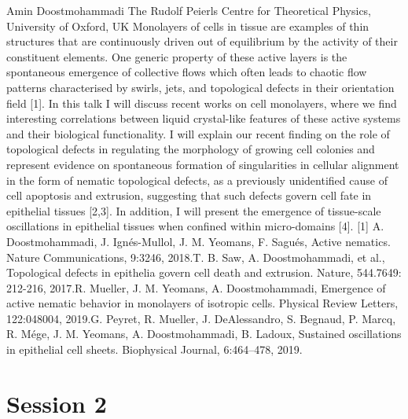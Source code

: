 \documentclass{article}
\begin{document}
{Amin Doostmohammadi}
{The Rudolf Peierls Centre for Theoretical Physics, University of Oxford, UK}
{Monolayers of cells in tissue are examples of thin structures that are continuously driven out of
equilibrium by the activity of their constituent elements. One generic property of these active
layers is the spontaneous emergence of collective flows which often leads to chaotic flow patterns
characterised by swirls, jets, and topological defects in their orientation field [1]. In this talk I
will discuss recent works on cell monolayers, where we find interesting correlations between liquid
crystal-like features of these active systems and their biological functionality.
I will explain our recent finding on the role of topological defects in regulating the morphology of
growing cell colonies and represent evidence on spontaneous formation of singularities in cellular
alignment in the form of nematic topological defects, as a previously unidentified cause of cell
apoptosis and extrusion, suggesting that such defects govern cell fate in epithelial tissues [2,3]. In
addition, I will present the emergence of tissue-scale oscillations in epithelial tissues when confined
within micro-domains [4].\newline\newline
\small{
[1] A. Doostmohammadi, J. Ignés-Mullol, J. M. Yeomans, F. Sagués, Active nematics. Nature
Communications, 9:3246, 2018.\newline
[2] T. B. Saw, A. Doostmohammadi, et al., Topological defects in epithelia govern cell death and
extrusion. Nature, 544.7649: 212-216, 2017.\newline
[3] R. Mueller, J. M. Yeomans, A. Doostmohammadi, Emergence of active nematic behavior in
monolayers of isotropic cells. Physical Review Letters, 122:048004, 2019.\newline
[4] G. Peyret, R. Mueller, J. DeAlessandro, S. Begnaud, P. Marcq, R. Mége, J. M. Yeomans,
A. Doostmohammadi, B. Ladoux, Sustained oscillations in epithelial cell sheets. Biophysical
Journal, 6:464–478, 2019.}}

\newpage
\section*{Session 2}
\end{document}
